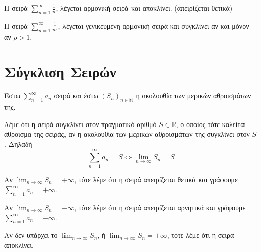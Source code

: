 \begin{rems}
\item {}
    \begin{myitemize}
    \item Η σειρά $ \sum_{n=1}^{\infty} \frac{1}{n}  $, λέγεται 
        \textcolor{Col2}{αρμονική σειρά} και αποκλίνει. (απειρίζεται θετικά)
    \item Η σειρά $ \sum_{n=1}^{\infty} \frac{1}{n^{\rho}}  $, λέγεται 
        \textcolor{Col2}{γενικευμένη αρμονική σειρά} και συγκλίνει αν και μόνον αν 
        $ \rho > 1 $.
    \end{myitemize}
\end{rems}

\section{Σύγκλιση Σειρών}

\begin{mybox1}
\begin{dfn}
Έστω $ \sum_{n=1}^{\infty} a_{n}  $ σειρά και έστω $ {(S_{n})}_{n \in \mathbb{N}} $ 
η ακολουθία των μερικών αθροισμάτων της. 

Λέμε ότι η σειρά \textcolor{Col2}{συγκλίνει} στον πραγματικό αριθμό 
$ S \in \mathbb{R} $, ο οποίος 
τότε καλείται \textcolor{Col2}{άθροισμα} της σειράς, αν η ακολουθία των 
μερικών αθροισμάτων της συγκλίνει στον $ S $. Δηλαδή
\[
    \sum_{n=1}^{\infty} a_{n} = S \Leftrightarrow \lim_{n \to \infty} S_{n} = S  
\] 
\end{dfn}
\end{mybox1}

\begin{rem}
\item {}
  \begin{myitemize}
    \item Αν $ \lim_{n \to \infty} S_{n} = + \infty $, τότε λέμε ότι η σειρά
      \textcolor{Col1}{απειρίζεται
      θετικά} και γράφουμε $ \sum_{n=1}^{\infty} a_{n} = + \infty $.
    \item Αν $ \lim_{n \to \infty} S_{n} = - \infty $, τότε λέμε ότι η σειρά
      \textcolor{Col1}{απειρίζεται
      αρνητικά} και γράφουμε $ \sum_{n=1}^{\infty} a_{n} = - \infty $.
    \item Αν δεν υπάρχει το $ \lim_{n \to \infty} S_{n} $, ή $ \lim_{n \to \infty} S_{n}=
      \pm \infty$, τότε λέμε ότι η σειρά \textcolor{Col1}{αποκλίνει}.

  \end{myitemize}
\end{rem}

